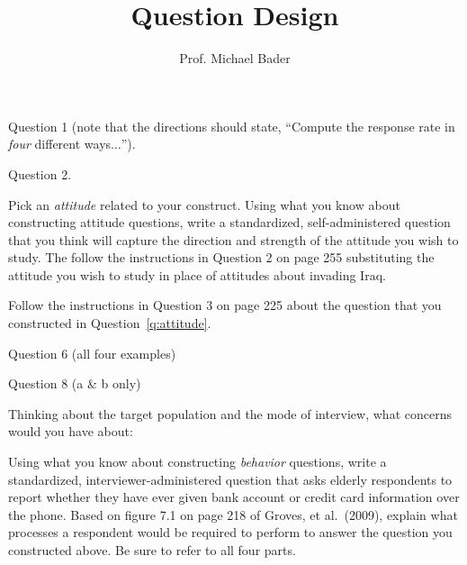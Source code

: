 \documentclass[11pt]{homework}
\title{Question Design}
\author{Prof. Michael Bader}
\begin{document}
\maketitle 

\begin{questions}

\question[4] Question 1 (note that the directions should state, ``Compute the response rate in \emph{four} different ways$\ldots$''). 

\question[3] Question 2.


\question[6] 
Pick an \emph{attitude} related to your construct. Using what you know about constructing attitude questions, write a standardized, self-administered question that you think will capture the direction and strength of the attitude you wish to study. The follow the instructions in Question 2 on page 255 substituting the attitude you wish to study in place of attitudes about invading Iraq. 
\label{q:attitude}

\question[4] Follow the instructions in Question 3 on page 225 about the question that you constructed in Question~\ref{q:attitude}. 

\question[2] Question 6 (all four examples)

\question[2] Question 8 (a \& b only)

\question Thinking about the target population and the mode of interview, what concerns would you have about:
\question[6] Using what you know about constructing \emph{behavior} questions, write a standardized, interviewer-administered question that asks elderly respondents to report whether they have ever given bank account or credit card information over the phone. 
\label{q:behavior} 
\question[2] Based on figure 7.1 on page 218 of Groves, et al.\ (2009), explain what processes a respondent would be required to perform to answer the question you constructed above. Be sure to refer to all four parts. 
\end{questions}
\end{document}
